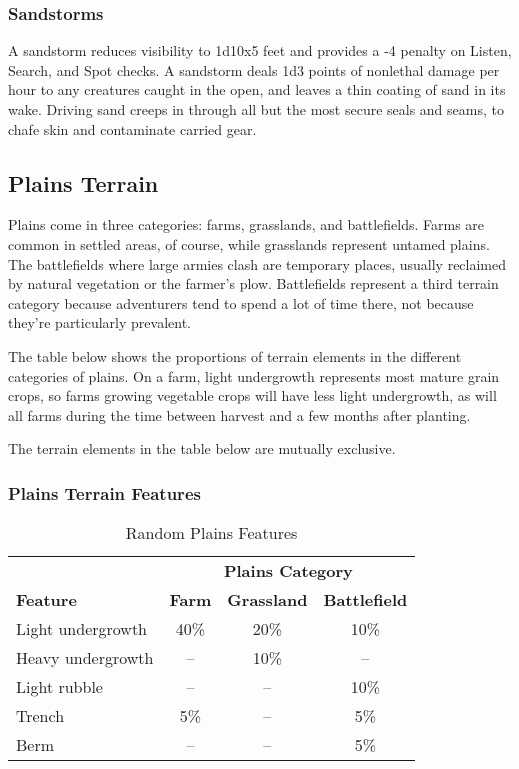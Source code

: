 \subsubsection{Sandstorms}

A sandstorm reduces visibility to 1d10x5 feet and provides a 
-4 penalty on Listen, Search, and Spot checks. A sandstorm deals 1d3 points of 
nonlethal damage per hour to any creatures caught in the open, and leaves a thin 
coating of sand in its wake. Driving sand creeps in through all but the most secure 
seals and seams, to chafe skin and contaminate carried gear. 

\subsection{Plains Terrain}

Plains come in three categories: farms, grasslands, and battlefields. Farms are 
common in settled areas, of course, while grasslands represent untamed plains. 
The battlefields where large armies clash are temporary places, usually reclaimed 
by natural vegetation or the farmer's plow. Battlefields represent a third terrain 
category because adventurers tend to spend a lot of time there, not because they're 
particularly prevalent.

The table below shows the proportions of terrain elements in the different categories 
of plains. On a farm, light undergrowth represents most mature grain crops, so 
farms growing vegetable crops will have less light undergrowth, as will all farms 
during the time between harvest and a few months after planting.

The terrain elements in the table below are mutually exclusive.

\subsubsection{Plains Terrain Features}

\begin{table}[htb]
\caption{Random Plains Features}
\centering
\begin{tabular}{l c c c}
 & \multicolumn{3}{c}{\textbf{Plains Category}}\\
\textbf{Feature} & \textbf{Farm} & \textbf{Grassland} & \textbf{Battlefield}\\
Light undergrowth & 40\% & 20\% & 10\%\\
Heavy undergrowth & -- & 10\% & --\\
Light rubble & -- & -- & 10\%\\
Trench & 5\% & -- & 5\%\\
Berm & -- & -- & 5\%\\
\end{tabular}
\end{table}

